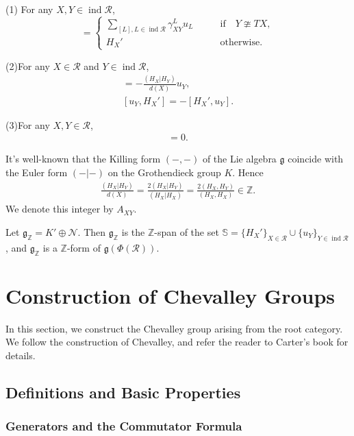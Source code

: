 \documentclass[12pt]{amsart}
\begin{document}
(1) For any $X,Y \in \operatorname{ind} \mathcal{R}$,
\begin{equation*}
  [u_X,u_Y]=
    \begin{cases}
        \sum\limits_{[L],L \in \operatorname{ind} \mathcal{R}} \gamma^L_{XY} u_L  \qquad &\text{if} \quad Y\ncong TX, \\
        H_X'  &\text{otherwise}.
    \end{cases}
\end{equation*}

(2)For any $X \in \mathcal{R}$ and $Y \in \operatorname{ind} \mathcal{R}$,
\begin{align*}
    [H_X',u_Y]=-\frac{(H_X|H_Y)}{d(X)}u_Y ,\\
    [u_Y,H_X']=-[H_X',u_Y].
\end{align*}

(3)For any $X,Y \in \mathcal{R}$,
\begin{align*}
    [H_X',H_Y']=0.
\end{align*}

It's well-known that the Killing form $(-,-)$ of the Lie algebra $\mathfrak{g}$ coincide with the Euler form $(-|-)$ on the Grothendieck group $K$.
Hence
\begin{align*}
    \frac{(H_X|H_Y)}{d(X)} = \frac{2(H_X|H_Y)}{(H_X|H_X)} = \frac{2(H_X,H_Y)}{(H_X,H_X)} \in \mathbb{Z}.
\end{align*}
We denote this integer by $A_{XY}$. 

Let $\mathfrak{g}_{\mathbb{Z}}=K' \oplus \mathcal{N}$.
Then $\mathfrak{g}_{\mathbb{Z}}$ is the $\mathbb{Z}$-span of the set $\mathbb{S}=\{ H_X' \}_{X\in \mathcal{R}} \cup \{ u_Y \}_{Y\in \operatorname{ind}\mathcal{R}}$,
and $\mathfrak{g}_{\mathbb{Z}}$ is a $\mathbb{Z}$-form of $\mathfrak{g}(\Phi(\mathcal{R}))$.

\section{Construction of Chevalley Groups}


In this section, we construct the Chevalley group arising from the root category.
We follow the construction of Chevalley, and refer the reader to Carter's book\cite{carter} for details.


\subsection{Definitions and Basic Properties}
\subsubsection{Generators and the Commutator Formula}
\end{document}
